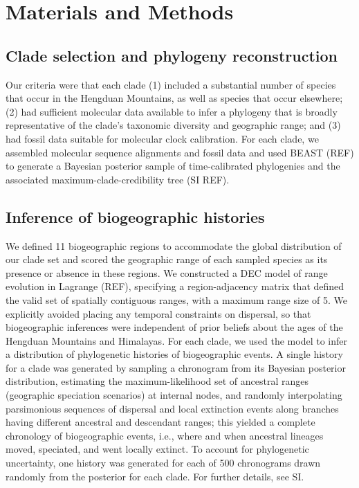 \section{Materials and Methods}

\subsection{Clade selection and phylogeny reconstruction}

Our criteria were that each clade (1) included a substantial number of species that occur in the Hengduan Mountains, as well as species that occur elsewhere; (2) had sufficient molecular data available to infer a phylogeny that is broadly representative of the clade's taxonomic diversity and geographic range; and (3) had fossil data suitable for molecular clock calibration. For each clade, we assembled molecular sequence alignments and fossil data and used BEAST (REF) to generate a Bayesian posterior sample of time-calibrated phylogenies and the associated maximum-clade-credibility tree (SI REF).

\subsection{Inference of biogeographic histories}

We defined 11 biogeographic regions to accommodate the global distribution of our clade set and scored the geographic range of each sampled species as its presence or absence in these regions. We constructed a DEC model of range evolution in Lagrange (REF), specifying a region-adjacency matrix that defined the valid set of spatially contiguous ranges, with a maximum range size of 5. We explicitly avoided placing any temporal constraints on dispersal, so that biogeographic inferences were independent of prior beliefs about the ages of the Hengduan Mountains and Himalayas. For each clade, we used the model to infer a distribution of phylogenetic histories of biogeographic events. A single history for a clade was generated by sampling a chronogram from its Bayesian posterior distribution, estimating the maximum-likelihood set of ancestral ranges (geographic speciation scenarios) at internal nodes, and randomly interpolating parsimonious sequences of dispersal and local extinction events along branches having different ancestral and descendant ranges; this yielded a complete chronology of biogeographic events, i.e., where and when ancestral lineages moved, speciated, and went locally extinct. To account for phylogenetic uncertainty, one history was generated for each of 500 chronograms drawn randomly from the posterior for each clade. For further details, see SI.

